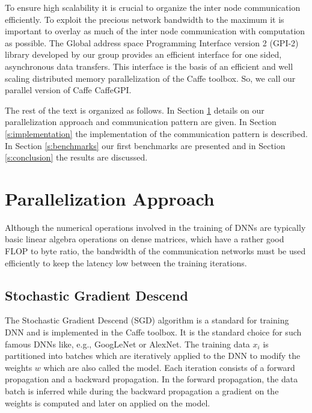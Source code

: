 \documentclass[twoside,twocolumn]{article}
\begin{document}
To ensure high scalability it is
crucial to organize the inter node communication efficiently.
To exploit the precious network bandwidth to the maximum it is
important to overlay as much of the inter node communication
with computation as possible. The
Global address space Programming Interface version 2
(GPI-2) library \cite{gpi2} developed
by our group provides an efficient interface for one sided,
asynchronous data transfers. This interface is the basis of an
efficient and well scaling distributed memory parallelization of 
the Caffe toolbox. So, we call our parallel version of Caffe
CaffeGPI.


The rest of the text is organized as follows. In Section
\ref{s:parallelization} details on our parallelization approach
and communication pattern are given.
In Section \ref{s:implementation} the implementation of the
communication pattern is described. In Section \ref{s:benchmarks}
our first benchmarks are presented and in Section \ref{s:conclusion}
the results are discussed.




\section{Parallelization Approach}

\label{s:parallelization}


Although the numerical operations involved in the training of DNNs are
typically basic linear algebra operations on dense matrices, which have
a rather good FLOP to byte ratio, the bandwidth of the communication networks
must be used efficiently to keep the latency low between the training
iterations.

\subsection{Stochastic Gradient Descend}
The Stochastic Gradient Descend (SGD) \cite{bottou2010large} algorithm is a standard for training
DNN and is implemented in the Caffe toolbox. It is the standard choice for such
famous DNNs like, e.g., GoogLeNet or AlexNet.
The training data $x_i$
is partitioned into batches which are iteratively applied
to the DNN to modify the weights $w$ which are also called the model.
Each iteration consists of a forward
propagation and a backward propagation. In the forward propagation, the data batch is
 inferred while during the backward propagation a gradient on the weights is computed
and later on applied on the model.
\end{document}
